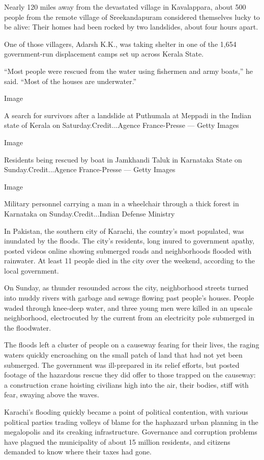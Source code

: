 Nearly 120 miles away from the devastated village in Kavalappara, about
500 people from the remote village of Sreekandapuram considered
themselves lucky to be alive: Their homes had been rocked by two
landslides, about four hours apart.

One of those villagers, Adarsh K.K., was taking shelter in one of the
1,654 government-run displacement camps set up across Kerala State.

``Most people were rescued from the water using fishermen and army
boats,'' he said. ``Most of the houses are underwater.''

Image

A search for survivors after a landslide at Puthumala at Meppadi in the
Indian state of Kerala on Saturday.Credit...Agence France-Presse ---
Getty Images

Image

Residents being rescued by boat in Jamkhandi Taluk in Karnataka State on
Sunday.Credit...Agence France-Presse --- Getty Images

Image

Military personnel carrying a man in a wheelchair through a thick forest
in Karnataka on Sunday.Credit...Indian Defense Ministry

In Pakistan, the southern city of Karachi, the country's most populated,
was inundated by the floods. The city's residents, long inured to
government apathy, posted videos online showing submerged roads and
neighborhoods flooded with rainwater. At least 11 people died in the
city over the weekend, according to the local government.

On Sunday, as thunder resounded across the city, neighborhood streets
turned into muddy rivers with garbage and sewage flowing past people's
houses. People waded through knee-deep water, and three young men were
killed in an upscale neighborhood, electrocuted by the current from an
electricity pole submerged in the floodwater.

The floods left a cluster of people on a causeway fearing for their
lives, the raging waters quickly encroaching on the small patch of land
that had not yet been submerged. The government was ill-prepared in its
relief efforts, but posted footage of the hazardous rescue they did
offer to those trapped on the causeway: a construction crane hoisting
civilians high into the air, their bodies, stiff with fear, swaying
above the waves.

Karachi's flooding quickly became a point of political contention, with
various political parties trading volleys of blame for the haphazard
urban planning in the megalopolis and its creaking infrastructure.
Governance and corruption problems have plagued the municipality of
about 15 million residents, and citizens demanded to know where their
taxes had gone.

